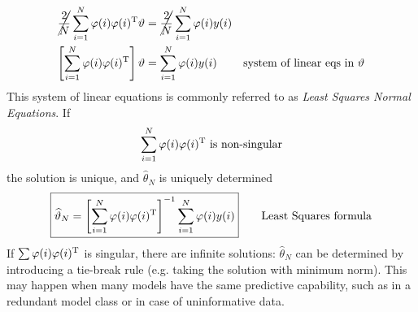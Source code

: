 \begin{align*}
\cancel{\frac{2}{N}}\sum _{i=1}^{N} \varphi (i) \varphi (i)^{\mathrm{T}} \vartheta  & =\cancel{\frac{2}{N}}\sum _{i=1}^{N} \varphi (i) y(i) & \\
\left[\sum _{i=1}^{N} \varphi (i) \varphi (i)^{\mathrm{T}}\right] \vartheta  & =\sum _{i=1}^{N} \varphi (i) y(i) & \text{system of linear eqs in} \ \vartheta 
\end{align*}
This system of linear equations is commonly referred to as \textit{Least Squares Normal Equations}. If 
\begin{equation*}
\sum _{i=1}^{N} \varphi (i) \varphi (i)^{\mathrm{T}} \ \text{is non-singular}
\end{equation*}
the solution is unique, and $ \hat{\theta }_{N}$ is uniquely determined
\begin{equation*}
\boxed{\widehat{\vartheta }_{N} =\left[\sum _{i=1}^{N} \varphi (i) \varphi (i)^{\mathrm{T}}\right]^{-1}\sum _{i=1}^{N} \varphi (i) y(i)}
\qquad \text{Least Squares formula}
\end{equation*}
If $ \sum \varphi (i) \varphi (i)^{\mathrm{T}}$ is singular, there are infinite solutions: $ \hat{\theta }_{N}$ can be determined by introducing a tie-break rule (e.g. taking the solution with minimum norm). This may happen when many models have the same predictive capability, such as in a redundant model class or in case of uninformative data.

